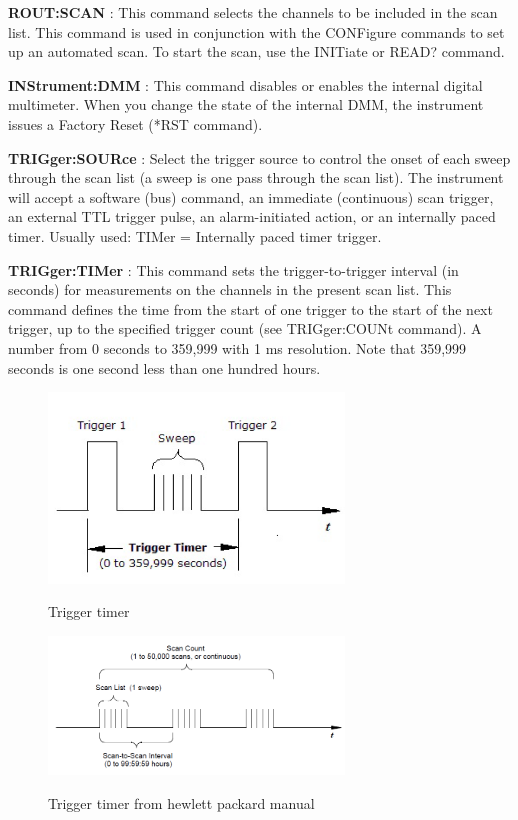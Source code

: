 \documentclass[a4paper]{article}
\begin{document}
{\textbf{ROUT:SCAN} : This command selects the channels to be included in the scan list. This command is used in conjunction with the CONFigure commands to set up an automated scan. To start the scan, use the INITiate or READ? command.

\textbf{INStrument:DMM} : This command disables or enables the internal digital multimeter. When you change the state of the internal DMM, the instrument issues a Factory Reset (*RST command).

\textbf{TRIGger:SOURce} : Select the trigger source to control the onset of each sweep through the scan list (a sweep is one pass through the scan list). The instrument will accept a software (bus) command, an immediate (continuous) scan trigger, an external TTL trigger pulse, an alarm-initiated action, or an internally paced timer. Usually used: TIMer = Internally paced timer trigger.

\textbf{TRIGger:TIMer} : This command sets the trigger-to-trigger interval (in seconds) for measurements on the channels in the present scan list. This command defines the time from the start of one trigger to the start of the next trigger, up to the specified trigger count (see TRIGger:COUNt command). A number from 0 seconds to 359,999 with 1 ms resolution. Note that 359,999 seconds is one second less than one hundred hours.


\begin{figure}[h!]
	\centering
	\includegraphics[width=0.7\textwidth]{trigger_timer.png}
	\label{fig:trigger_timer}
	\caption{Trigger timer}
\end{figure}

\begin{figure}[h!]
	\centering
	\includegraphics[width=0.7\textwidth]{trigger_timer2.png}
	\label{fig:trigger_timer2}
	\caption{Trigger timer from hewlett packard manual}
\end{figure}



}
\end{document}
